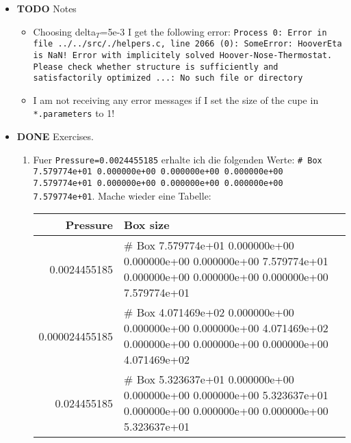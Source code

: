 \documentclass[11pt]{article}
\begin{document}
\begin{itemize}

\item \textbf{TODO} Notes\\
\label{sec-2.4.6.1}

\begin{itemize}
\item Choosing delta$_T$=5e-3 I get the following error: \texttt{Process 0: Error in file ../../src/./helpers.c, line 2066 (0): SomeError: HooverEta is NaN! Error with implicitely solved Hoover-Nose-Thermostat. Please check whether structure is sufficiently and satisfactorily optimized ...: No such file or directory}
\item I am not receiving any error messages if I set the size of the cupe in \texttt{*.parameters} to 1!
\end{itemize}

\item \textbf{DONE} Exercises.\\
\label{sec-2.4.6.2}

\begin{enumerate}
\item Fuer \texttt{Pressure=0.0024455185} erhalte ich die folgenden Werte: \texttt{\# Box  7.579774e+01    0.000000e+00    0.000000e+00    0.000000e+00    7.579774e+01    0.000000e+00    0.000000e+00    0.000000e+00    7.579774e+01}. Mache wieder eine Tabelle: 

\begin{center}
\begin{tabular}{rl}
       Pressure  &  Box size                                                                                                                                                \\
\hline
   0.0024455185  &  \# Box    7.579774e+01    0.000000e+00    0.000000e+00    0.000000e+00    7.579774e+01    0.000000e+00    0.000000e+00    0.000000e+00    7.579774e+01  \\
 0.000024455185  &  \# Box  4.071469e+02    0.000000e+00    0.000000e+00    0.000000e+00    4.071469e+02    0.000000e+00    0.000000e+00    0.000000e+00    4.071469e+02    \\
    0.024455185  &  \# Box  5.323637e+01    0.000000e+00    0.000000e+00    0.000000e+00    5.323637e+01    0.000000e+00    0.000000e+00    0.000000e+00    5.323637e+01    \\
\end{tabular}
\end{center}



\end{enumerate}
\end{itemize}
\end{document}
